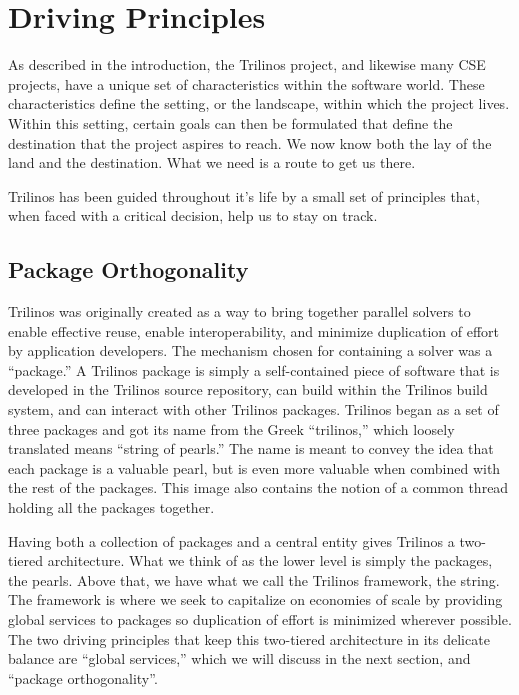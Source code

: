 \documentclass[12pt,relax]{article}
\begin{document}
\section{Driving Principles}
\label{Section:Driving Principles}

As described in the introduction, the Trilinos project, and likewise many CSE
projects, have a unique set of characteristics within the software world.
These characteristics define the setting, or the landscape, within which the
project lives.  Within this setting, certain goals can then be formulated that
define the destination that the project aspires to reach.  We now know both the
lay of the land and the destination.  What we need is a route to get us there.

Trilinos has been guided throughout it's life by a small set of principles
that, when faced with a critical decision, help us to stay on track.  

\subsection{Package Orthogonality}

Trilinos was originally created as a way to bring together parallel solvers
to enable effective reuse, enable interoperability, and minimize duplication of
effort by application developers.  The mechanism chosen for containing a solver
was a ``package.''  A Trilinos package is simply a self-contained piece of
software that is developed in the Trilinos source repository, can build within
the Trilinos build system, and can interact with other Trilinos packages.
Trilinos began as a set of three packages and got its name from the Greek 
``trilinos,'' which loosely translated means ``string of pearls.''  The name is
meant to convey the idea that each package is a valuable pearl, but is even
more valuable when combined with the rest of the packages.  This image also
contains the notion of a common thread holding all the packages together.

Having both a collection of packages and a central entity gives Trilinos a
two-tiered architecture.  What we think of as the lower level is simply the
packages, the pearls.  Above that, we have what we call the Trilinos framework,
the string.  The framework is where we seek to capitalize on economies of scale
by providing global services to packages so duplication of effort is minimized
wherever possible.  The two driving principles that keep this two-tiered
architecture in its delicate balance are ``global services,'' which we will
discuss in the next section, and ``package orthogonality''.
\end{document}
